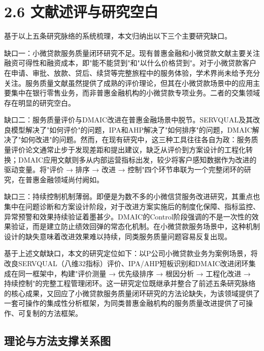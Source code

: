 \section{2.6 文献述评与研究空白}

基于以上五条研究脉络的系统梳理，本文归纳出以下三个主要研究缺口。\par

缺口一：小微贷款服务质量闭环研究不足。现有普惠金融和小微贷款文献主要关注融资可得性和融资成本，即"能不能贷到"和"以什么价格贷到"\cite{ref2,ref6}。对于小微贷款客户在申请、审批、放款、贷后、续贷等完整旅程中的服务体验，学术界尚未给予充分关注。服务质量文献虽然提供了成熟的评价理论，但其在小微贷款场景中的应用主要集中在银行零售业务，而非普惠金融机构的小微贷款专项业务\cite{ref14,ref15}。二者的交集领域存在明显的研究空白。\par

缺口二：服务质量评价与DMAIC改进在普惠金融场景中脱节。SERVQUAL及其改良模型解决了"如何评价"的问题，IPA和AHP解决了"如何排序"的问题，DMAIC解决了"如何改进"的问题。然而，在现有研究中，这三种工具往往各自为政：服务质量评价论文通常止步于发现差距和提出建议，缺乏从评价到方案设计的工程化转换；DMAIC应用文献则多从内部运营指标出发，较少将客户感知数据作为改进的驱动变量\cite{ref49,ref12}。将"评价 → 排序 → 改进 → 控制"四个环节串联为一个完整闭环的研究，在普惠金融领域尚付阙如。\par

缺口三：持续控制机制薄弱。即便是为数不多的小微信贷服务改进研究，其重点也集中在问题诊断和方案设计阶段，对于改进方案实施后的制度化保障、指标监控、异常预警和效果持续验证着墨甚少\cite{ref50}。DMAIC的Control阶段强调的不是一次性的效果验证，而是建立防止绩效回弹的常态化机制。在小微贷款服务场景中，这种机制设计的缺失意味着改进效果难以持续，同类服务质量问题容易反复出现。\par

基于上述文献缺口，本文的研究定位如下：以P公司小微贷款业务为案例场景，将改良SERVQUAL（八维32指标）评价、IPA/AHP短板识别和DMAIC改进闭环集成在同一框架中，构建"评价测量 → 优先级排序 → 根因分析 → 工程化改进 → 持续控制"的完整工程管理闭环。这一研究定位既继承并整合了前述五条研究脉络的核心成果，又回应了小微贷款服务质量闭环研究的方法论缺失，为该领域提供了一套可操作的集成性分析框架，为同类普惠金融机构的服务质量改进提供了可操作、可复制的方法框架。\par

\subsection*{理论与方法支撑关系图}

